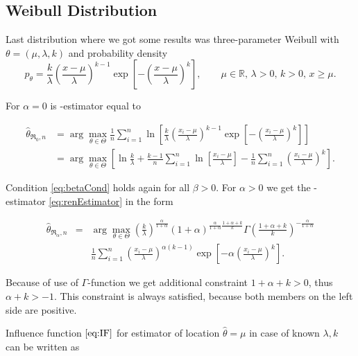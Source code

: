 \subsection{Weibull Distribution} 

Last distribution where we got some results was three-parameter Weibull with $\theta = (\mu,\lambda,k)$ and probability density
\begin{equation}
	p_\theta =  \frac{k}{\lambda} \left( \frac{x-\mu}{\lambda} \right)^{k-1} \exp \left[ -\left( \frac{x-\mu}{\lambda} \right)^k \right], \qquad \mu \in \mathbb{R}, \, \lambda>0, \, k>0, \, x \geq \mu.
\end{equation}

\noindent For $\alpha = 0$ is \mRa-estimator equal to

\begin{align}
	\hat{\theta}_{\mathfrak{R}_0,n} & = \arg \max_{\theta \in \Theta} \frac{1}{n} \sum^n_{i=1} \ln \left[ \frac{k}{\lambda} \left( \frac{x_i-\mu}{\lambda} \right)^{k-1} 
	\exp \left[ -\left( \frac{x_i-\mu}{\lambda} \right)^k \right]\right] \nonumber \\
	&=\arg \max_{\theta \in \Theta}\left[ \ln \frac{k}{\lambda} + \frac{k-1}{n} \sum^n_{i=1} \ln \left[  \frac{x_i-\mu}{\lambda} \right] - 
	\frac{1}{n} \sum^n_{i=1} \left(  \frac{x_i-\mu}{\lambda} \right)^k \right].
\end{align}

\noindent Condition \ref{eq:betaCond} holds again for all $\beta>0$. For $\alpha>0$ we get the \mRa-estimator \eqref{eq:renEstimator} in the form

\begin{eqnarray}
	\hat{\theta}_{\mathfrak{R}_\alpha,n} & = & \arg \max_{\theta \in \Theta} \left( \frac{k}{\lambda} \right)^\frac{\alpha}{1+\alpha} (1+\alpha)^{\frac{\alpha}{1+\alpha}\frac{1+\alpha+k}{k}} 
	\Gamma\left(\frac{1+\alpha+k}{k}\right)^{-\frac{\alpha}{1+\alpha}} \nonumber \\
	&& \frac{1}{n}\sum_{i=1}^n \left( \frac{x_i-\mu}{\lambda}\right)^{\alpha(k-1)} \exp\left[-\alpha \left(\frac{x_i-\mu}{\lambda}\right)^k\right].
\end{eqnarray}

\noindent Because of use of $\Gamma$-function we get additional constraint  $1+\alpha+k>0$, thus $\alpha + k > -1$. This constraint is always satisfied, because both members on the left side are positive.

Influence function $\eqref{eq:IF}$ for estimator of location $\hat{\theta} = \mu$ in case of known $\lambda, k $  can be written as

